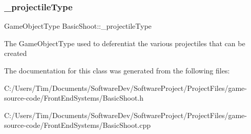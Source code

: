 \subsubsection{\texorpdfstring{\+\_\+projectile\+Type}{\_projectileType}}
{\footnotesize\ttfamily Game\+Object\+Type Basic\+Shoot\+::\+\_\+projectile\+Type\hspace{0.3cm}{\ttfamily [private]}}

The Game\+Object\+Type used to deferentiat the various projectiles that can be created 

The documentation for this class was generated from the following files\+:\begin{DoxyCompactItemize}
\item 
C\+:/\+Users/\+Tim/\+Documents/\+Software\+Dev/\+Software\+Project/\+Project\+Files/game-\/source-\/code/\+Front\+End\+Systems/Basic\+Shoot.\+h\item 
C\+:/\+Users/\+Tim/\+Documents/\+Software\+Dev/\+Software\+Project/\+Project\+Files/game-\/source-\/code/\+Front\+End\+Systems/Basic\+Shoot.\+cpp\end{DoxyCompactItemize}
